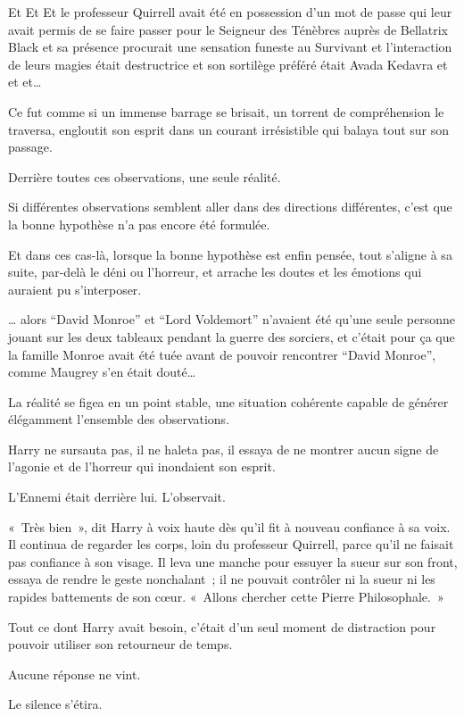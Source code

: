 \later

Et Et Et le professeur Quirrell avait été en possession d'un mot de passe qui leur avait permis de se faire passer pour le Seigneur des Ténèbres auprès de Bellatrix Black et sa présence procurait une sensation funeste au Survivant et l'interaction de leurs magies était destructrice et son sortilège préféré était Avada Kedavra et et et…

Ce fut comme si un immense barrage se brisait, un torrent de compréhension le traversa, engloutit son esprit dans un courant irrésistible qui balaya tout sur son passage.

Derrière toutes ces observations, une seule réalité.

Si différentes observations semblent aller dans des directions différentes, c'est que la bonne hypothèse n'a pas encore été formulée.

Et dans ces cas-là, lorsque la bonne hypothèse est enfin pensée, tout s'aligne à sa suite, par-delà le déni ou l'horreur, et arrache les doutes et les émotions qui auraient pu s'interposer.

… alors “David Monroe” et “Lord Voldemort” n'avaient été qu'une seule personne jouant sur les deux tableaux pendant la guerre des sorciers, et c'était pour ça que la famille Monroe avait été tuée avant de pouvoir rencontrer “David Monroe”, comme Maugrey s'en était douté…

La réalité se figea en un point stable, une situation cohérente capable de générer élégamment l'ensemble des observations.

Harry ne sursauta pas, il ne haleta pas, il essaya de ne montrer aucun signe de l'agonie et de l'horreur qui inondaient son esprit.

L'Ennemi était derrière lui.
L'observait.

«~Très bien~», dit Harry à voix haute dès qu'il fit à nouveau confiance à sa voix.
Il continua de regarder les corps, loin du professeur Quirrell, parce qu'il ne faisait pas confiance à son visage.
Il leva une manche pour essuyer la sueur sur son front, essaya de rendre le geste nonchalant~; il ne pouvait contrôler ni la sueur ni les rapides battements de son cœur.
«~Allons chercher cette Pierre Philosophale.~»

Tout ce dont Harry avait besoin, c'était d'un seul moment de distraction pour pouvoir utiliser son retourneur de temps.

Aucune réponse ne vint.

Le silence s'étira.

